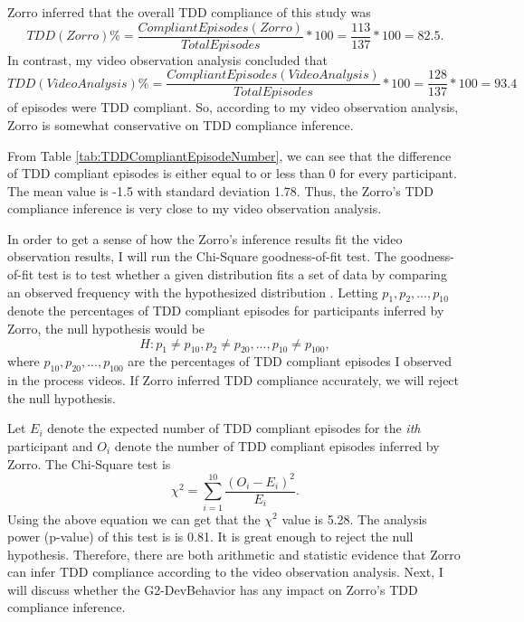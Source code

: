 Zorro inferred that the overall TDD compliance of this study was 
\[
   TDD(Zorro)\% = \frac{CompliantEpisodes(Zorro)}{TotalEpisodes} * 100
   = \frac{113}{137} * 100 = 82.5.
\]
In contrast, my video observation analysis concluded that 
\[
   TDD(Video Analysis)\% =
   \frac{CompliantEpisodes(VideoAnalysis)}{TotalEpisodes} * 100 =
   \frac{128}{137} * 100 = 93.4
\]
of episodes were TDD compliant. So, according to my video observation
analysis, Zorro is somewhat conservative on TDD compliance inference.  

From Table \ref{tab:TDDCompliantEpisodeNumber}, we can see that
the difference of TDD compliant episodes is either equal to or less 
than 0 for every participant. The mean value is -1.5 with 
standard deviation 1.78. Thus, the Zorro's TDD compliance inference
is very close to my video observation analysis.

In order to get a sense of how the Zorro's inference results fit the
video observation results, I will run the Chi-Square goodness-of-fit 
test. The goodness-of-fit test is to test whether a given distribution 
fits a set of data by comparing an observed frequency with the hypothesized 
distribution \cite{GoodnessOfFit,Anderson:86}. Letting \begin{math}p_{1},
p_{2}, ..., p_{10} \end{math} denote the percentages of TDD compliant 
episodes for participants inferred by Zorro, the null hypothesis 
would be
\[
    H: p_{1} \neq p_{10},p_{2} \neq p_{20}, ..., p_{10} \neq p_{100}, 
\]
where \begin{math}p_{10},p_{20}, ..., p_{100} \end{math} are the
percentages of TDD compliant episodes I observed in the process
videos. If Zorro inferred TDD compliance accurately, we will reject
the null hypothesis.

Let \begin{math}E_{i}\end{math} denote the expected number of TDD
compliant episodes for the \textit{ith} participant and
\begin{math}O_{i}\end{math} denote the number of TDD compliant 
episodes inferred by Zorro. The Chi-Square test is
\begin{equation} \label{ChiEquation}
  \chi^2 = \sum_{i=1}^{10}\frac{(O_{i}-E_{i})^2}{E_i}.
\end{equation}
Using the above equation we can get that the \begin{math}\chi^2\end{math} 
value is 5.28. The analysis power (p-value) of this test is is 0.81. 
It is great enough to reject the null hypothesis. Therefore, 
there are both arithmetic and statistic evidence that Zorro 
can infer TDD compliance according to the video observation 
analysis. Next, I will discuss whether the G2-DevBehavior has
any impact on Zorro's TDD compliance inference.

